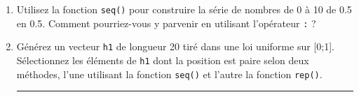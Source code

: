 \documentclass[12pt,twosided, notitlepage]{book}
\newenvironment{Shaded}{}{}
\newcommand{\KeywordTok}[1]{\textcolor[rgb]{0.00,0.00,1.00}{#1}}
\newcommand{\DataTypeTok}[1]{#1}
\newcommand{\DecValTok}[1]{#1}
\newcommand{\FloatTok}[1]{#1}
\newcommand{\StringTok}[1]{\textcolor[rgb]{0.00,0.50,0.50}{#1}}
\newcommand{\CommentTok}[1]{\textcolor[rgb]{0.00,0.50,0.00}{#1}}
\newcommand{\OperatorTok}[1]{#1}
\newcommand{\NormalTok}[1]{#1}
\newif \ifsol
\renewenvironment{Shaded}{\begin{snugshade}}{\end{snugshade}}
\begin{document}

\begin{enumerate}
\def\labelenumi{\alph{enumi}.}
\item
  Utilisez la fonction \texttt{seq()} pour
  construire la série de nombres de 0 à 10 de 0.5 en 0.5. Comment
  pourriez-vous y parvenir en utilisant l'opérateur
  \texttt{:}\index{\texttt{:}} ?

  \ifsol 

  \begin{center} \rule{0.5\linewidth}{\linethickness}\end{center}

\begin{Shaded}
\begin{Highlighting}[]
\CommentTok{# Méthode directe : utilisation de l'argument by = de seq()}
\KeywordTok{seq}\NormalTok{(}\DecValTok{0}\NormalTok{, }\DecValTok{10}\NormalTok{, }\DataTypeTok{by =} \FloatTok{0.5}\NormalTok{)}
\NormalTok{  ##  [1]  0.0  0.5  1.0  1.5  2.0  2.5  3.0  3.5  4.0  4.5  5.0  5.5}
\NormalTok{  ## [13]  6.0  6.5  7.0  7.5  8.0  8.5  9.0  9.5 10.0}

\CommentTok{# Méthode "manuelle" : utilisation de `:` et division}
\NormalTok{(}\DecValTok{0}\OperatorTok{:}\DecValTok{20}\NormalTok{) }\OperatorTok{/}\StringTok{ }\DecValTok{2}
\NormalTok{  ##  [1]  0.0  0.5  1.0  1.5  2.0  2.5  3.0  3.5  4.0  4.5  5.0  5.5}
\NormalTok{  ## [13]  6.0  6.5  7.0  7.5  8.0  8.5  9.0  9.5 10.0}
\end{Highlighting}
\end{Shaded}

  \begin{center} \rule{0.5\linewidth}{\linethickness}\end{center}

  \bigskip  \fi 
\item
  Générez un vecteur \texttt{h1} de longueur 20 tiré dans une loi
  uniforme sur {[}0;1{]}. Sélectionnez les
  éléments de \texttt{h1} dont la position est paire selon deux
  méthodes, l'une utilisant la fonction
  \texttt{seq()} et l'autre la fonction
  \texttt{rep()}.

  \ifsol 

  \begin{center} \rule{0.5\linewidth}{\linethickness}\end{center}


\end{enumerate}
\end{document}
